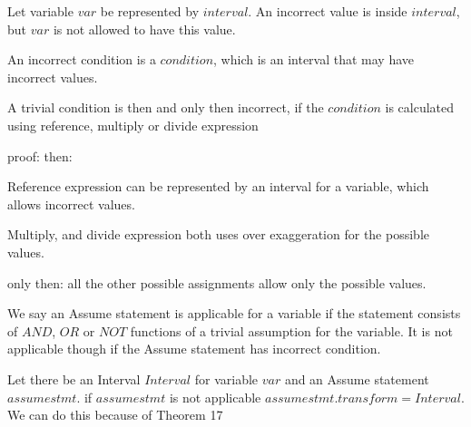 \begin{definition}
	Let variable $var$ be represented by $interval$. An incorrect value is inside $interval$,  but $var$ is not allowed to have this value.
\end{definition}

\begin{definition}
	An incorrect condition is a $condition$, which is an interval that may have incorrect values.
\end{definition}

\begin{theorem}
	A trivial condition is then and only then incorrect, if the $condition$ is calculated using reference, multiply or divide expression
\end{theorem} 
{proof: } then:

 Reference expression can be represented by an interval for a variable, which allows incorrect values.
 
 Multiply, and divide expression both uses over exaggeration for the possible values.
 
 only then: all the other possible assignments allow only the possible values. 

\begin{definition}
	We say an Assume statement is applicable for a variable if the statement consists of $AND$, $OR$ or $NOT$ functions of a trivial assumption for the variable. It is not applicable though if the Assume statement has incorrect condition.
\end{definition}

Let there be an Interval $Interval$ for variable $var$ and an Assume statement $assumestmt$. if $assumestmt$ is not applicable $assumestmt.transform = Interval$. We can do this because of Theorem 17


